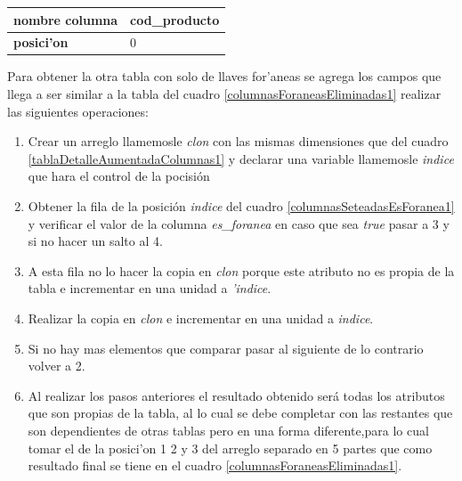 
\begin{center}
  \label{columnasForaneasEliminadas1} %
  \begin{tabular}{|l|l|}
  \hline 
  \textbf{nombre columna} & cod\_producto \\ \hline
  \textbf{posici'on}      & 0             \\ \hline
  \end{tabular}
\end{center}
Para obtener la otra tabla con solo de llaves for'aneas se agrega los campos que llega a ser similar a la tabla del cuadro \ref{columnasForaneasEliminadas1} realizar las siguientes operaciones:
 \begin{enumerate}
 \item Crear un arreglo llamemosle \textit{clon} con las mismas dimensiones que del cuadro \ref{tablaDetalleAumentadaColumnas1} y declarar una variable llamemosle \textit{indice} que hara el control de la pocisi\'on  
 \item Obtener la fila de la posici\'on \textit{indice} del cuadro \ref{columnasSeteadasEsForanea1} y verificar el valor de la columna \textit{es\_foranea} en caso que sea \textit{true} pasar a 3 y si no hacer un salto al 4.
 \item A esta fila no lo hacer la copia en \textit{clon} porque este atributo no es propia de la tabla e incrementar en una unidad a \textit{'indice}.
 \item Realizar la copia en \textit{clon} e incrementar en una unidad a \textit{indice}.
 \item Si no hay mas elementos que comparar pasar al siguiente de lo contrario volver a 2.
 \item Al realizar los pasos anteriores el resultado obtenido ser\'a todas los atributos que son propias de la tabla, al lo cual se debe completar con las restantes que son dependientes de otras tablas pero en una forma diferente,para lo cual tomar el de la posici'on 1 2 y 3 del arreglo separado en 5 partes que como resultado final se tiene en el cuadro \ref{columnasForaneasEliminadas1}.
 \end{enumerate}
